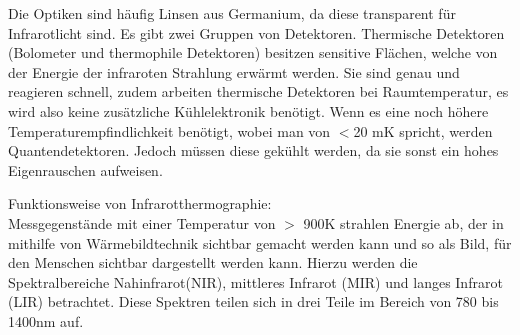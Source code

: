Die Optiken sind häufig Linsen aus Germanium, da diese transparent für Infrarotlicht sind. Es
gibt zwei Gruppen von Detektoren. Thermische Detektoren (Bolometer und
thermophile Detektoren) besitzen sensitive Flächen, welche von der Energie der
infraroten Strahlung erwärmt werden. Sie sind genau und reagieren schnell,
zudem arbeiten thermische Detektoren bei Raumtemperatur, es wird also keine
zusätzliche Kühlelektronik benötigt. Wenn es eine noch höhere
Temperaturempfindlichkeit benötigt, wobei man von $<$20 mK spricht, werden
Quantendetektoren. Jedoch müssen diese gekühlt werden, da sie sonst ein hohes
Eigenrauschen aufweisen.\cite{may2015transiente}

Funktionsweise von Infrarotthermographie: \\ Messgegenstände mit einer
Temperatur von $>$ 900K strahlen Energie ab, der in mithilfe von
Wärmebildtechnik sichtbar gemacht werden kann und so als Bild, für den Menschen
sichtbar dargestellt werden kann. Hierzu werden die Spektralbereiche
Nahinfrarot(NIR), mittleres Infrarot (MIR) und langes Infrarot (LIR)
betrachtet. Diese Spektren teilen sich in drei Teile im Bereich von 780 bis
1400nm auf.\cite{schuster2004infrarotthermographie}